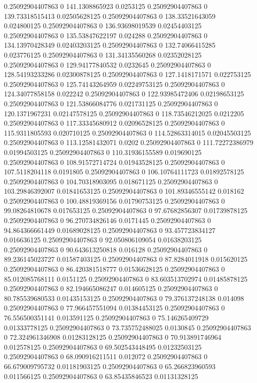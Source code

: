 0.25092904407863 0 141.1308865923 0.0253125
0.25092904407863 0 139.73318515413 0.02505628125
0.25092904407863 0 138.33521643059 0.024800125
0.25092904407863 0 136.93698019539 0.02454403125
0.25092904407863 0 135.53847622197 0.024288
0.25092904407863 0 134.13970428349 0.02403203125
0.25092904407863 0 132.74066415285 0.023776125
0.25092904407863 0 131.34135560268 0.02352028125
0.25092904407863 0 129.94177840532 0.0232645
0.25092904407863 0 128.54193233286 0.02300878125
0.25092904407863 0 127.1418171571 0.022753125
0.25092904407863 0 125.74143264959 0.02249753125
0.25092904407863 0 124.34077858158 0.022242
0.25092904407863 0 122.93985472406 0.02198653125
0.25092904407863 0 121.53866084776 0.021731125
0.25092904407863 0 120.1371967231 0.02147578125
0.25092904407863 0 118.73546212025 0.0212205
0.25092904407863 0 117.33345680912 0.02096528125
0.25092904407863 0 115.9311805593 0.020710125
0.25092904407863 0 114.52863314015 0.02045503125
0.25092904407863 0 113.12581432071 0.0202
0.25092904407863 0 111.72272386979 0.01994503125
0.25092904407863 0 110.31936155589 0.019690125
0.25092904407863 0 108.91572714724 0.01943528125
0.25092904407863 0 107.5118204118 0.0191805
0.25092904407863 0 106.10764111723 0.01892578125
0.25092904407863 0 104.70318903095 0.018671125
0.25092904407863 0 103.29846392007 0.01841653125
0.25092904407863 0 101.89346555142 0.018162
0.25092904407863 0 100.48819369156 0.01790753125
0.25092904407863 0 99.08264810678 0.017653125
0.25092904407863 0 97.67682856307 0.01739878125
0.25092904407863 0 96.270734826146 0.0171445
0.25092904407863 0 94.864366661449 0.01689028125
0.25092904407863 0 93.457723834127 0.016636125
0.25092904407863 0 92.050806109054 0.01638203125
0.25092904407863 0 90.643613250818 0.016128
0.25092904407863 0 89.236145023727 0.01587403125
0.25092904407863 0 87.8284011918 0.015620125
0.25092904407863 0 86.420381518777 0.01536628125
0.25092904407863 0 85.012085768111 0.0151125
0.25092904407863 0 83.603513702974 0.01485878125
0.25092904407863 0 82.194665086247 0.014605125
0.25092904407863 0 80.785539680533 0.01435153125
0.25092904407863 0 79.376137248138 0.014098
0.25092904407863 0 77.966457551094 0.01384453125
0.25092904407863 0 76.556500351141 0.013591125
0.25092904407863 0 75.146265409729 0.01333778125
0.25092904407863 0 73.735752488025 0.0130845
0.25092904407863 0 72.324961346908 0.01283128125
0.25092904407863 0 70.913891746964 0.012578125
0.25092904407863 0 69.502543448495 0.01232503125
0.25092904407863 0 68.090916211511 0.012072
0.25092904407863 0 66.679009795732 0.01181903125
0.25092904407863 0 65.266823960593 0.011566125
0.25092904407863 0 63.85435846523 0.01131328125
